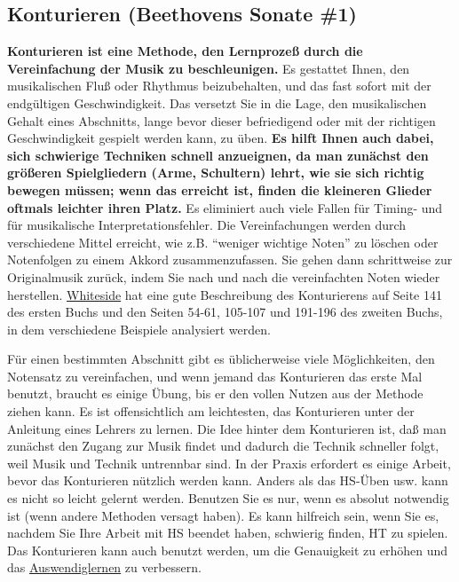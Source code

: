 
\subsection{Konturieren (Beethovens Sonate \#1)}
\label{c1iii8} 

\textbf{Konturieren ist eine Methode, den Lernprozeß durch die Vereinfachung der Musik zu beschleunigen.}
Es gestattet Ihnen, den musikalischen Fluß oder Rhythmus beizubehalten, und das fast sofort mit der endgültigen Geschwindigkeit.
Das versetzt Sie in die Lage, den musikalischen Gehalt eines Abschnitts, lange bevor dieser befriedigend oder mit der richtigen Geschwindigkeit gespielt werden kann, zu üben.
\textbf{Es hilft Ihnen auch dabei, sich schwierige Techniken schnell anzueignen, da man zunächst den größeren Spielgliedern (Arme, Schultern) lehrt, wie sie sich richtig bewegen müssen; wenn das erreicht ist, finden die kleineren Glieder oftmals leichter ihren Platz.}
Es eliminiert auch viele Fallen für Timing- und für musikalische Interpretationsfehler.
Die Vereinfachungen werden durch verschiedene Mittel erreicht, wie z.B. \enquote{weniger wichtige Noten} zu löschen oder Notenfolgen zu einem Akkord zusammenzufassen.
Sie gehen dann schrittweise zur Originalmusik zurück, indem Sie nach und nach die vereinfachten Noten wieder herstellen.
\hyperref[Whiteside]{Whiteside} hat eine gute Beschreibung des Konturierens auf Seite 141 des ersten Buchs und den Seiten 54-61, 105-107 und 191-196 des zweiten Buchs, in dem verschiedene Beispiele analysiert werden.

Für einen bestimmten Abschnitt gibt es üblicherweise viele Möglichkeiten, den Notensatz zu vereinfachen, und wenn jemand das Konturieren das erste Mal benutzt, braucht es einige Übung, bis er den vollen Nutzen aus der Methode ziehen kann.
Es ist offensichtlich am leichtesten, das Konturieren unter der Anleitung eines Lehrers zu lernen.
Die Idee hinter dem Konturieren ist, daß man zunächst den Zugang zur Musik findet und dadurch die Technik schneller folgt, weil Musik und Technik untrennbar sind.
In der Praxis erfordert es einige Arbeit, bevor das Konturieren nützlich werden kann.
Anders als das HS-Üben usw. kann es nicht so leicht gelernt werden.
Benutzen Sie es nur, wenn es absolut notwendig ist (wenn andere Methoden versagt haben).
Es kann hilfreich sein, wenn Sie es, nachdem Sie Ihre Arbeit mit HS beendet haben, schwierig finden, HT zu spielen.
Das Konturieren kann auch benutzt werden, um die Genauigkeit zu erhöhen und das \hyperref[c1iii6]{Auswendiglernen} zu verbessern.

